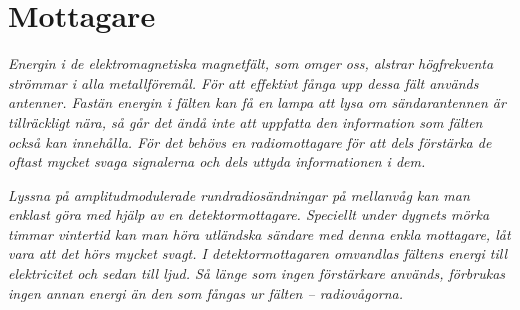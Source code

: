 \section{Mottagare}
\label{mottagare}

\emph{Energin i de elektromagnetiska magnetfält, som omger oss,
  alstrar högfrekventa strömmar i alla metallföremål.
  För att effektivt fånga upp dessa fält används antenner.
  Fastän energin i fälten kan få en lampa att lysa om sändarantennen
  är tillräckligt nära, så går det ändå inte att uppfatta den information
  som fälten också kan innehålla.
  För det behövs en radiomottagare för att dels förstärka de oftast mycket
  svaga signalerna och dels uttyda informationen i dem.}

\emph{Lyssna på amplitudmodulerade rundradiosändningar på mellanvåg
  kan man enklast göra med hjälp av en detektormottagare.
  Speciellt under dygnets mörka timmar vintertid kan man höra utländska sändare
  med denna enkla mottagare, låt vara att det hörs mycket svagt.
  I detektormottagaren omvandlas fältens energi till elektricitet och
  sedan till ljud.
  Så länge som ingen förstärkare används, förbrukas ingen annan energi än
  den som fångas ur fälten -- radiovågorna.}

